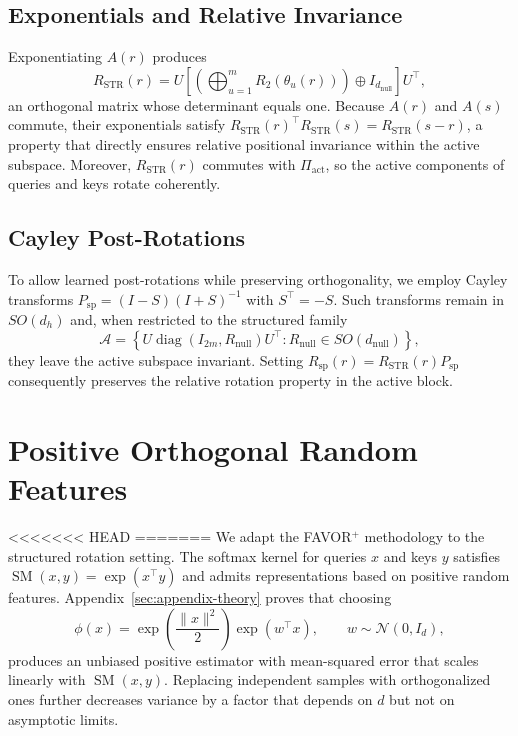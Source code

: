 \documentclass[11pt]{article}
\begin{document}
\subsection{Exponentials and Relative Invariance}

Exponentiating $A(r)$ produces
\[
R_{\mathrm{STR}}(r) = U \left[\left(\bigoplus_{u=1}^m R_2(\theta_u(r))\right) \oplus I_{d_{\mathrm{null}}}\right] U^\top,
\]
an orthogonal matrix whose determinant equals one. Because $A(r)$ and $A(s)$ commute, their
exponentials satisfy $R_{\mathrm{STR}}(r)^\top R_{\mathrm{STR}}(s) = R_{\mathrm{STR}}(s-r)$, a property
that directly ensures relative positional invariance within the active subspace. Moreover,
$R_{\mathrm{STR}}(r)$ commutes with $\Pi_{\mathrm{act}}$, so the active components of queries and keys
rotate coherently.

\subsection{Cayley Post-Rotations}

To allow learned post-rotations while preserving orthogonality, we employ Cayley transforms
$P_{\mathrm{sp}} = (I-S)(I+S)^{-1}$ with $S^\top = -S$. Such transforms remain in $SO(d_h)$ and,
when restricted to the structured family
\[
\mathcal{A} = \left\{U \operatorname{diag}(I_{2m}, R_{\mathrm{null}}) U^\top: R_{\mathrm{null}}\in SO(d_{\mathrm{null}})\right\},
\]
they leave the active subspace invariant. Setting $R_{\mathrm{sp}}(r) = R_{\mathrm{STR}}(r) P_{\mathrm{sp}}$
consequently preserves the relative rotation property in the active block.

\section{Positive Orthogonal Random Features}
\label{sec:favor-structured}

<<<<<<< HEAD
=======
We adapt the FAVOR$^+$ methodology to the structured rotation setting. The softmax kernel for
queries $x$ and keys $y$ satisfies $\operatorname{SM}(x,y) = \exp(x^\top y)$ and admits representations
based on positive random features. Appendix~\ref{sec:appendix-theory} proves that choosing
\[
\phi(x) = \exp\left(\frac{\|x\|^2}{2}\right) \exp(w^\top x),
\qquad w \sim \mathcal{N}(0,I_d),
\]
produces an unbiased positive estimator with mean-squared error that scales linearly with $\operatorname{SM}(x,y)$.
Replacing independent samples with orthogonalized ones further decreases variance by a factor that
depends on $d$ but not on asymptotic limits.
\end{document}
